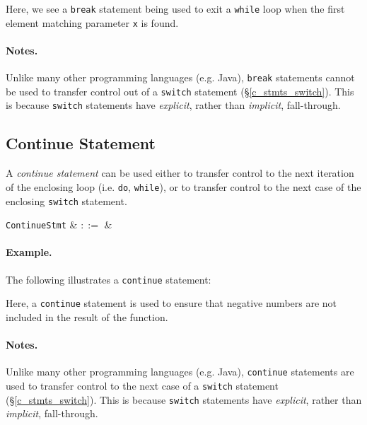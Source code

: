 Here, we see a \lstinline{break} statement being used to exit a \lstinline{while} loop when the first element matching parameter \lstinline{x} is found.  

\paragraph{Notes.} Unlike many other programming languages (e.g. Java), \lstinline{break} statements cannot be used to transfer control out of a \lstinline{switch} statement (\S\ref{c_stmts_switch}).  This is because \lstinline{switch} statements have {\em explicit}, rather than {\em implicit}, fall-through.


\subsection{Continue Statement}
\label{c_stmts_continue}
A {\em continue statement} can be used either to transfer control to the next iteration of the enclosing loop (i.e. \lstinline{do}, \lstinline{while}), or to transfer control to the next case of the enclosing \lstinline{switch} statement.

\begin{syntax}
  \verb+ContinueStmt+ & $::=$ & \\
\end{syntax}

\paragraph{Example.} The following illustrates a \lstinline{continue} statement:



Here, a \lstinline{continue} statement is used to ensure that negative numbers are not included in the result of the function.

\paragraph{Notes.} Unlike many other programming languages (e.g. Java), \lstinline{continue} statements are used to transfer control to the next case of a \lstinline{switch} statement (\S\ref{c_stmts_switch}).  This is because \lstinline{switch} statements have {\em explicit}, rather than {\em implicit}, fall-through.

